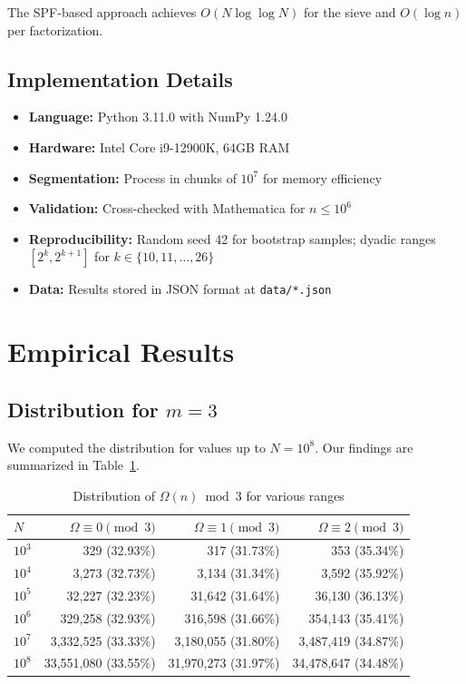 \documentclass[12pt]{article}
\theoremstyle{definition}
\theoremstyle{remark}
\begin{document}
The SPF-based approach achieves $O(N \log \log N)$ for the sieve and $O(\log n)$ per factorization.

\subsection{Implementation Details}

\begin{itemize}
\item \textbf{Language:} Python 3.11.0 with NumPy 1.24.0
\item \textbf{Hardware:} Intel Core i9-12900K, 64GB RAM
\item \textbf{Segmentation:} Process in chunks of $10^7$ for memory efficiency
\item \textbf{Validation:} Cross-checked with Mathematica for $n \leq 10^6$
\item \textbf{Reproducibility:} Random seed 42 for bootstrap samples; dyadic ranges $[2^k, 2^{k+1}]$ for $k \in \{10, 11, \ldots, 26\}$
\item \textbf{Data:} Results stored in JSON format at \texttt{data/*.json}
\end{itemize}

\section{Empirical Results}

\subsection{Distribution for $m = 3$}

We computed the distribution for values up to $N = 10^8$. Our findings are summarized in Table~\ref{tab:omega3}.

\begin{table}[ht]
\centering
\caption{Distribution of $\Omega(n) \bmod 3$ for various ranges}
\label{tab:omega3}
\begin{tabular}{@{}lrrr@{}}
\toprule
$N$ & $\Omega \equiv 0 \pmod{3}$ & $\Omega \equiv 1 \pmod{3}$ & $\Omega \equiv 2 \pmod{3}$ \\
\midrule
$10^3$ & 329 (32.93\%) & 317 (31.73\%) & 353 (35.34\%) \\
$10^4$ & 3,273 (32.73\%) & 3,134 (31.34\%) & 3,592 (35.92\%) \\
$10^5$ & 32,227 (32.23\%) & 31,642 (31.64\%) & 36,130 (36.13\%) \\
$10^6$ & 329,258 (32.93\%) & 316,598 (31.66\%) & 354,143 (35.41\%) \\
$10^7$ & 3,332,525 (33.33\%) & 3,180,055 (31.80\%) & 3,487,419 (34.87\%) \\
$10^8$ & 33,551,080 (33.55\%) & 31,970,273 (31.97\%) & 34,478,647 (34.48\%) \\
\bottomrule
\end{tabular}
\end{table}
\end{document}
